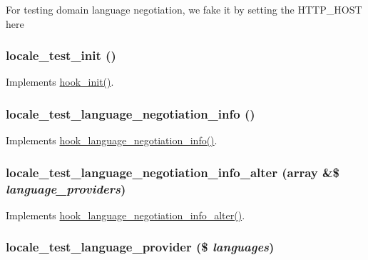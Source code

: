 For testing domain language negotiation, we fake it by setting the HTTP\_\-HOST here \hypertarget{locale__test_8module_a0c7f19a698f46c68061bc35ee695fc15}{
\subsubsection[{locale\_\-test\_\-init}]{\setlength{\rightskip}{0pt plus 5cm}locale\_\-test\_\-init ()}}
\label{locale__test_8module_a0c7f19a698f46c68061bc35ee695fc15}
Implements \hyperlink{group__hooks_ga74edef0c463436fdbb1f92ef367db051}{hook\_\-init()}. \hypertarget{locale__test_8module_a1f997fc5113895acdbfae86ae1663d0f}{
\subsubsection[{locale\_\-test\_\-language\_\-negotiation\_\-info}]{\setlength{\rightskip}{0pt plus 5cm}locale\_\-test\_\-language\_\-negotiation\_\-info ()}}
\label{locale__test_8module_a1f997fc5113895acdbfae86ae1663d0f}
Implements \hyperlink{group__language__negotiation_gabcac4b239272ba30c6320a0af2fab46e}{hook\_\-language\_\-negotiation\_\-info()}. \hypertarget{locale__test_8module_af4f45f558d8b91ec470a7bfe61603616}{
\subsubsection[{locale\_\-test\_\-language\_\-negotiation\_\-info\_\-alter}]{\setlength{\rightskip}{0pt plus 5cm}locale\_\-test\_\-language\_\-negotiation\_\-info\_\-alter (array \&\$ {\em language\_\-providers})}}
\label{locale__test_8module_af4f45f558d8b91ec470a7bfe61603616}
Implements \hyperlink{group__language__negotiation_gacaed046505a0a8470514731b86910089}{hook\_\-language\_\-negotiation\_\-info\_\-alter()}. \hypertarget{locale__test_8module_abffb4b9384b6cc1f12d88b25c531cd46}{
\subsubsection[{locale\_\-test\_\-language\_\-provider}]{\setlength{\rightskip}{0pt plus 5cm}locale\_\-test\_\-language\_\-provider (\$ {\em languages})}}
